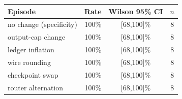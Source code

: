 \begin{tabular}{@{}l c c c@{}}
\toprule
\textbf{Episode} & \textbf{Rate} & \textbf{Wilson 95\% CI} & $n$\\
\midrule
no change (specificity) & 100\% & [68,100]\% & 8 \\
output-cap change & 100\% & [68,100]\% & 8 \\
ledger inflation & 100\% & [68,100]\% & 8 \\
wire rounding & 100\% & [68,100]\% & 8 \\
checkpoint swap & 100\% & [68,100]\% & 8 \\
router alternation & 100\% & [68,100]\% & 8 \\
\bottomrule
\end{tabular}
